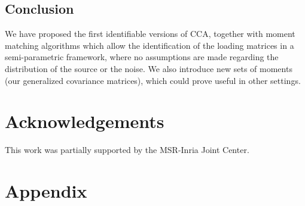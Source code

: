 \documentclass{article}
\begin{document}
\subsection*{Conclusion} We have proposed the first identifiable versions of CCA, together with moment matching algorithms which allow the identification of the loading matrices in a semi-parametric framework, where no assumptions are made regarding the distribution of the source or the noise. We also introduce new sets of moments (our generalized covariance matrices), which could prove useful in other settings.
 































\section*{Acknowledgements} 
This work was partially supported by the MSR-Inria Joint Center.  
















\cleardoublepage
\newpage
\section{Appendix}
\appendix
\renewcommand{\thesubsection}{\Alph{subsection}}
\end{document}

